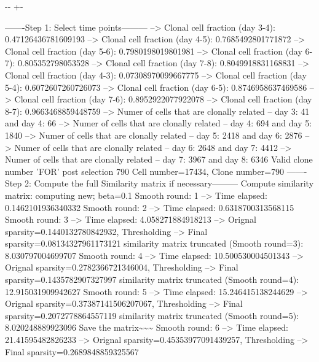 \documentclass[letterpaper,10pt,english]{sphinxmanual}
\newlength\nbsphinxcodecellspacing
\begin{document}
{

\kern-\sphinxverbatimsmallskipamount\kern-\baselineskip
\kern+\FrameHeightAdjust\kern-\fboxrule
\vspace{\nbsphinxcodecellspacing}

\begin{sphinxVerbatim}[commandchars=\\\{\}]
-------Step 1: Select time points---------
--> Clonal cell fraction (day 3-4): 0.47126436781609193
--> Clonal cell fraction (day 4-5): 0.7685492801771872
--> Clonal cell fraction (day 5-6): 0.7980198019801981
--> Clonal cell fraction (day 6-7): 0.805352798053528
--> Clonal cell fraction (day 7-8): 0.8049918831168831
--> Clonal cell fraction (day 4-3): 0.07308970099667775
--> Clonal cell fraction (day 5-4): 0.6072607260726073
--> Clonal cell fraction (day 6-5): 0.8746958637469586
--> Clonal cell fraction (day 7-6): 0.8952922077922078
--> Clonal cell fraction (day 8-7): 0.9663468859448759
--> Numer of cells that are clonally related -- day 3: 41  and day 4: 66
--> Numer of cells that are clonally related -- day 4: 694  and day 5: 1840
--> Numer of cells that are clonally related -- day 5: 2418  and day 6: 2876
--> Numer of cells that are clonally related -- day 6: 2648  and day 7: 4412
--> Numer of cells that are clonally related -- day 7: 3967  and day 8: 6346
Valid clone number 'FOR' post selection 790
Cell number=17434, Clone number=790
-------Step 2: Compute the full Similarity matrix if necessary---------
Compute similarity matrix: computing new; beta=0.1
Smooth round: 1
--> Time elapsed: 0.1462101936340332
Smooth round: 2
--> Time elapsed: 0.6318700313568115
Smooth round: 3
--> Time elapsed: 4.058271884918213
--> Orignal sparsity=0.1440132780842932, Thresholding
--> Final sparsity=0.08134327961173121
similarity matrix truncated (Smooth round=3):  8.030797004699707
Smooth round: 4
--> Time elapsed: 10.500530004501343
--> Orignal sparsity=0.2782366721346004, Thresholding
--> Final sparsity=0.1435782907327997
similarity matrix truncated (Smooth round=4):  12.915031909942627
Smooth round: 5
--> Time elapsed: 15.246415138244629
--> Orignal sparsity=0.37387141506207067, Thresholding
--> Final sparsity=0.2072778864557119
similarity matrix truncated (Smooth round=5):  8.020248889923096
Save the matrix\textasciitilde{}\textasciitilde{}\textasciitilde{}
Smooth round: 6
--> Time elapsed: 21.41595482826233
--> Orignal sparsity=0.45353977091439257, Thresholding
--> Final sparsity=0.2689848859325567

\end{sphinxVerbatim}}
\end{document}
